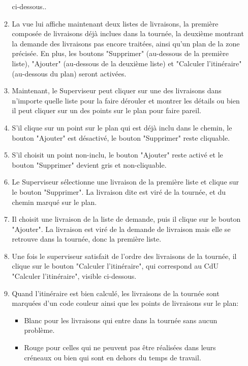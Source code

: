 \documentclass[a4paper]{article}
\begin{document}
\begin{itemize}[label = \textbullet, font = \color{orange}]
\begin{enumerate}
            ci-dessous..
        \item La vue lui affiche maintenant deux listes de livraisons, la
            première composée de livraisons déjà inclues dans la tournée, la
            deuxième montrant la demande des livraisons pas encore traitées,
            ainsi qu'un plan de la zone précisée. En plus, les boutons
            "Supprimer" (au-dessous de la première liste), "Ajouter"
            (au-dessous de la deuxième liste) et "Calculer l'itinéraire"
            (au-dessous du plan) seront activées.
        \item Maintenant, le Superviseur peut cliquer sur une des livraisons
            dans n'importe quelle liste pour la faire dérouler et montrer les
            détails ou bien il peut cliquer sur un des points sur le plan pour
            faire pareil.
        \item S'il clique sur un point sur le plan qui est déjà inclu dans le
            chemin, le bouton "Ajouter" est désactivé, le bouton "Supprimer"
            reste cliquable.
        \item S'il choisit un point non-inclu, le bouton "Ajouter" reste activé
            et le bouton "Supprimer" devient gris et non-cliquable.
        \item Le Superviseur sélectionne une livraison de la première liste et
            clique sur le bouton "Supprimer". La livraison dite est viré de la
            tournée, et du chemin marqué sur le plan.
        \item Il choisit une livraison de la liste de demande, puis il clique
            sur le bouton "Ajouter". La livraison est viré de la demande de
            livraison mais elle se retrouve dans la tournée, donc la première
            liste.
        \item Une fois le superviseur satisfait de l'ordre des livraisons de la
            tournée, il clique sur le bouton "Calculer l'itinéraire", qui
            correspond au CdU "Calculer l'itinéraire", visible ci-dessous.
        \item Quand l'itinéraire est bien calculé, les livraisons de la tournée
            sont marquées d'un code couleur ainsi que les points de livraisons
            sur le plan:
        \begin{itemize}
            \item Blanc pour les livraisons qui entre dans la tournée sans aucun problème.
            \item Rouge pour celles qui ne peuvent pas être réalisées dans leurs créneaux ou bien qui sont en dehors du temps de travail.

\end{itemize}
\end{enumerate}
\end{itemize}
\end{document}
